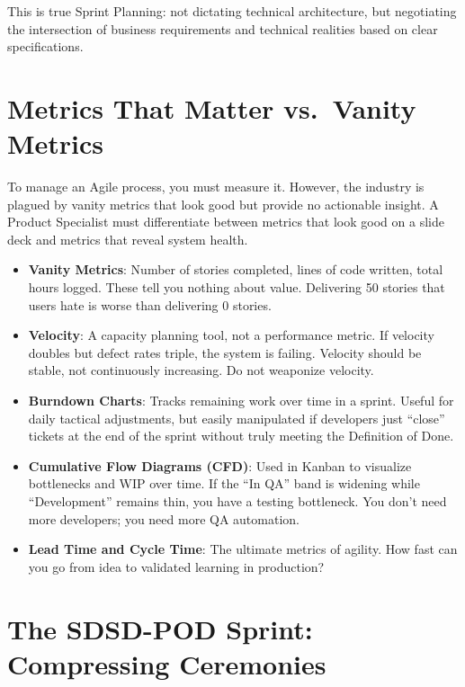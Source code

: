\documentclass[
  11pt,
  openany,
  oneside]{book}
\providecommand{\tightlist}{%
  \setlength{\itemsep}{0pt}\setlength{\parskip}{0pt}}
\begin{document}
This is true Sprint Planning: not dictating technical architecture, but
negotiating the intersection of business requirements and technical
realities based on clear specifications.

\section{Metrics That Matter vs.~Vanity
Metrics}\label{metrics-that-matter-vs.-vanity-metrics}

To manage an Agile process, you must measure it. However, the industry
is plagued by vanity metrics that look good but provide no actionable
insight. A Product Specialist must differentiate between metrics that
look good on a slide deck and metrics that reveal system health.

\begin{itemize}
\tightlist
\item
  \textbf{Vanity Metrics}: Number of stories completed, lines of code
  written, total hours logged. These tell you nothing about value.
  Delivering 50 stories that users hate is worse than delivering 0
  stories.
\item
  \textbf{Velocity}: A capacity planning tool, not a performance metric.
  If velocity doubles but defect rates triple, the system is failing.
  Velocity should be stable, not continuously increasing. Do not
  weaponize velocity.
\item
  \textbf{Burndown Charts}: Tracks remaining work over time in a sprint.
  Useful for daily tactical adjustments, but easily manipulated if
  developers just ``close'' tickets at the end of the sprint without
  truly meeting the Definition of Done.
\item
  \textbf{Cumulative Flow Diagrams (CFD)}: Used in Kanban to visualize
  bottlenecks and WIP over time. If the ``In QA'' band is widening while
  ``Development'' remains thin, you have a testing bottleneck. You don't
  need more developers; you need more QA automation.
\item
  \textbf{Lead Time and Cycle Time}: The ultimate metrics of agility.
  How fast can you go from idea to validated learning in production?
\end{itemize}

\section{The SDSD-POD Sprint: Compressing
Ceremonies}\label{the-sdsd-pod-sprint-compressing-ceremonies}
\end{document}
